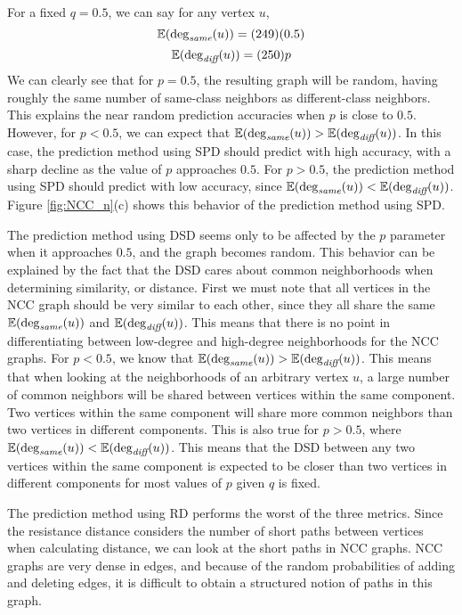 For a fixed $q=0.5$, we can say for any vertex $u$,
$$\mathbb{E}(\deg_{\textit{same}}(u)) = (249)(0.5)$$
$$\mathbb{E}(\deg_{\textit{diff}}(u)) = (250)p$$
We can clearly see that for $p=0.5$, the resulting graph will be random,
having roughly the same number of same-class neighbors as different-class 
neighbors. This explains the near random prediction accuracies when $p$ is
close to $0.5$. However, for $p < 0.5$, we can expect that
$\mathbb{E}(\deg_{\textit{same}}(u)) > \mathbb{E}(\deg_{\textit{diff}}(u))$.
In this case, the prediction method using SPD should predict with high
accuracy, with a sharp decline as the value of $p$ approaches $0.5$. For 
$p > 0.5$, the prediction method using SPD should predict with low 
accuracy, since $\mathbb{E}(\deg_{\textit{same}}(u)) < \mathbb{E}(\deg_{\textit{diff}}(u))$. Figure
\ref{fig:NCC_n}(c) shows this behavior of the prediction method using SPD.

The prediction method using DSD seems only to be affected by the $p$
parameter when it approaches $0.5$, and the graph becomes random. This
behavior can be explained by the fact that the DSD cares about common
neighborhoods when determining similarity, or distance. First we must note
that all vertices in the NCC graph should be very similar to each other,
since they all share the same $\mathbb{E}(\deg_{\textit{same}}(u))$ and
$\mathbb{E}(\deg_{\textit{diff}}(u))$. This means that there is no point in differentiating
between low-degree and high-degree neighborhoods for the NCC graphs.
For $p < 0.5$, we know that $\mathbb{E}(\deg_{\textit{same}}(u)) > \mathbb{E}(\deg_{\textit{diff}}(u))$.
This means that when looking at the neighborhoods of an arbitrary vertex 
$u$, a large number of common neighbors will be shared between vertices
within the same component. Two vertices within the same component will 
share more common neighbors than two vertices in different components. This 
is also true for $p > 0.5$, where 
$\mathbb{E}(\deg_{\textit{same}}(u)) < \mathbb{E}(\deg_{\textit{diff}}(u))$. This means that the DSD
between any two vertices within the same component is expected to be closer
than two vertices in different components for most values of $p$ given $q$ 
is fixed.

The prediction method using RD performs the worst of the three metrics.
Since the resistance distance considers the number of short paths between
vertices when calculating distance, we can look at the short paths in NCC
graphs. NCC graphs are very dense in edges, and because of the random
probabilities of adding and deleting edges, it is difficult to obtain a
structured notion of paths in this graph.

